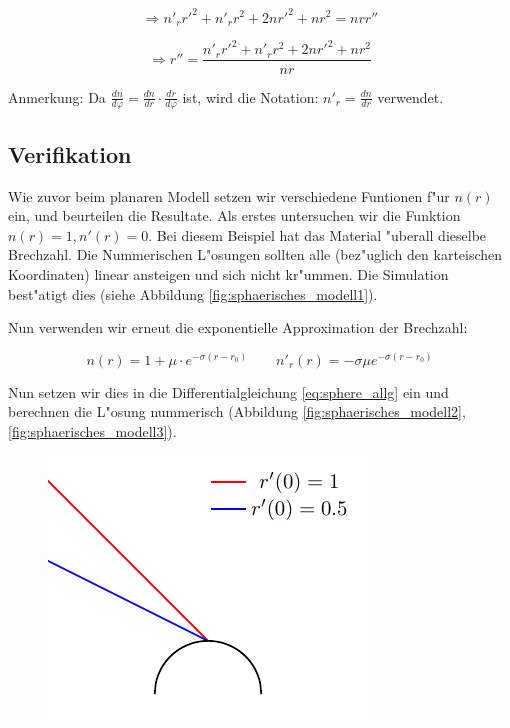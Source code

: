 \begin{refsection}
$$\Rightarrow n'_r r'^2 + n'_r r^2 + 2 n r'^2 + n r^2 = n r r''$$

\begin{equation} \label{eq:sphere_allg}
\Rightarrow r'' = \frac{n'_r r'^2 + n'_r r^2 + 2 n r'^2 + n r^2}{n r}
\end{equation}

Anmerkung: Da $\frac{dn}{d\varphi} = \frac{dn}{dr} \cdot \frac{dr}{d\varphi}$ ist, wird die Notation: $n'_r = \frac{dn}{dr}$ verwendet.

\subsection{Verifikation}
Wie zuvor beim planaren Modell setzen wir verschiedene Funtionen f"ur $n(r)$ ein, und beurteilen die Resultate. 
Als erstes untersuchen wir die Funktion $n(r) = 1, n'(r) = 0$. 
Bei diesem Beispiel hat das Material "uberall dieselbe Brechzahl.
Die Nummerischen L"osungen sollten alle (bez"uglich den karteischen Koordinaten) linear ansteigen und sich nicht kr"ummen. Die Simulation best"atigt dies (siehe Abbildung \ref{fig:sphaerisches_modell1}).

Nun verwenden wir erneut die exponentielle Approximation der Brechzahl: 

$$n(r) = 1 + \mu \cdot e^{-\sigma (r - r_0)} \qquad n'_r(r) = -\sigma \mu e^{-\sigma (r - r_0)}$$

Nun setzen wir dies in die Differentialgleichung \ref{eq:sphere_allg} ein und berechnen die L"osung nummerisch (Abbildung \ref{fig:sphaerisches_modell2}, \ref{fig:sphaerisches_modell3}). 

\begin{figure}
\centering
\includegraphics[scale=1]{licht/standalone/fig_sphere_simulation_vacuum.pdf}
\end{figure}


\end{refsection}

